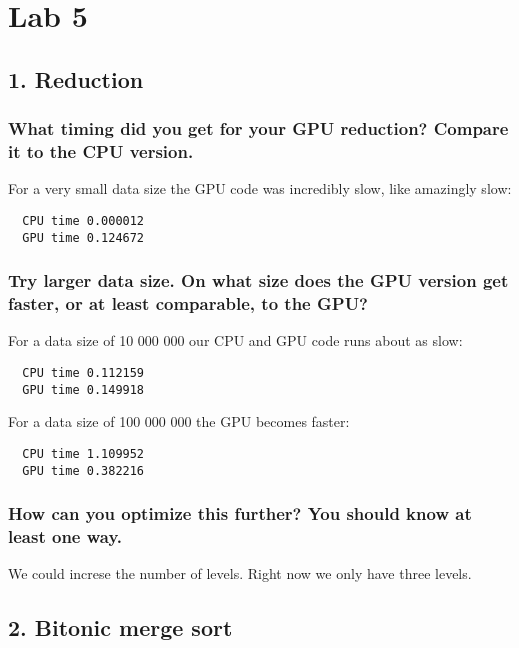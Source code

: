\documentclass[a4paper,12pt]{article}
\begin{document}
\section{Lab 5}

\subsection{1. Reduction}

\subsubsection{What timing did you get for your GPU reduction? Compare it to the CPU version.}

For a very small data size the GPU code was incredibly slow, like amazingly slow:

\begin{lstlisting}
  CPU time 0.000012
  GPU time 0.124672
\end{lstlisting}


\subsubsection{Try larger data size. On what size does the GPU version get faster, or at least comparable, to the GPU?}

For a data size of 10 000 000 our CPU and GPU code runs about as slow:

\begin{lstlisting}
  CPU time 0.112159
  GPU time 0.149918
\end{lstlisting}

For a data size of 100 000 000 the GPU becomes faster:

\begin{lstlisting}
  CPU time 1.109952
  GPU time 0.382216
\end{lstlisting}


\subsubsection{How can you optimize this further? You should know at least one way.}

We could increse the number of levels. Right now we only have three levels.




\subsection{2. Bitonic merge sort}
\end{document}
